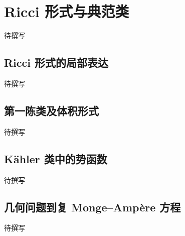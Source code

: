 
% 
% 

\section{Ricci 形式与典范类}
\label{g4:sec:3101}

待撰写

\subsection{Ricci 形式的局部表达}
\label{g4:subsec:3101:01}
待撰写

\subsection{第一陈类及体积形式}
\label{g4:subsec:3101:02}
待撰写

\subsection{Kähler 类中的势函数}
\label{g4:subsec:3101:03}
待撰写

\subsection{几何问题到复 Monge–Ampère 方程}
\label{g4:subsec:3101:04}
待撰写
